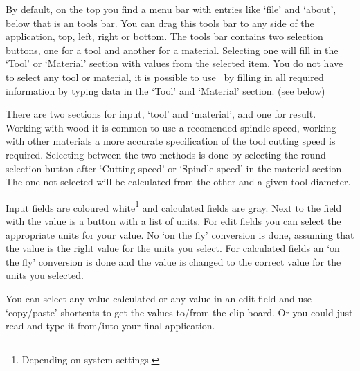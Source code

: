 By default, on the top you find a menu bar with entries like `file' and `about', below that is an
tools bar. You can drag this tools bar to any side of the application, top, left, right or bottom.
The tools bar contains two selection buttons, one for a tool and another for a material. Selecting
one will fill in the `Tool' or `Material' section with values from the selected item. You do not
have to select any tool or material, it is possible to use \CC\ by filling in all required information
by typing data in the `Tool'  and `Material' section. (see below)

There are two sections for input, `tool' and `material', and one for result. Working with wood it
is common to use a recomended spindle speed, working with other materials a more accurate specification
of the tool cutting speed is required. Selecting between the two methods is done by selecting the
round selection button after `Cutting speed' or `Spindle speed' in the material section. The one
not selected will be calculated from the other and a given tool diameter.

Input fields are coloured white\footnote{Depending on system settings.} and calculated fields are gray.
Next to the field with the value is a button with a list of units. For edit fields you can select
the appropriate units for your value. No `on the fly' conversion is done, assuming that the value
is the right value for the units you select. For calculated fields an `on the fly' conversion is
done and the value is changed to the correct value for the units you selected.

You can select any value calculated or any value in an edit field and use `copy/paste' shortcuts
to get the values to/from the clip board. Or you could just read and type it from/into your final
application.
